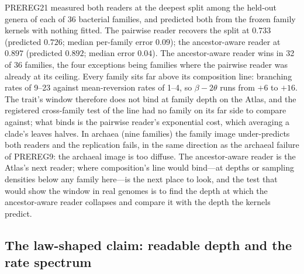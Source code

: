 \documentclass[11pt]{article}
\begin{document}
PREREG21 measured both readers at the deepest split among the held-out genera of each of 36 bacterial families, and predicted both from the frozen family kernels with nothing fitted. The pairwise reader recovers the split at $0.733$ (predicted $0.726$; median per-family error $0.09$); the ancestor-aware reader at $0.897$ (predicted $0.892$; median error $0.04$). The ancestor-aware reader wins in 32 of 36 families, the four exceptions being families where the pairwise reader was already at its ceiling. Every family sits far above its composition line: branching rates of 9--23 against mean-reversion rates of 1--4, so $\beta-2\theta$ runs from $+6$ to $+16$. The trait's window therefore does not bind at family depth on the Atlas, and the registered cross-family test of the line had no family on its far side to compare against; what binds is the pairwise reader's exponential cost, which averaging a clade's leaves halves. In archaea (nine families) the family image under-predicts both readers and the replication fails, in the same direction as the archaeal failure of PREREG9: the archaeal image is too diffuse. The ancestor-aware reader is the Atlas's next reader; where composition's line would bind---at depths or sampling densities below any family here---is the next place to look, and the test that would show the window in real genomes is to find the depth at which the ancestor-aware reader collapses and compare it with the depth the kernels predict.

\subsection{The law-shaped claim: readable depth and the rate spectrum}
\end{document}
